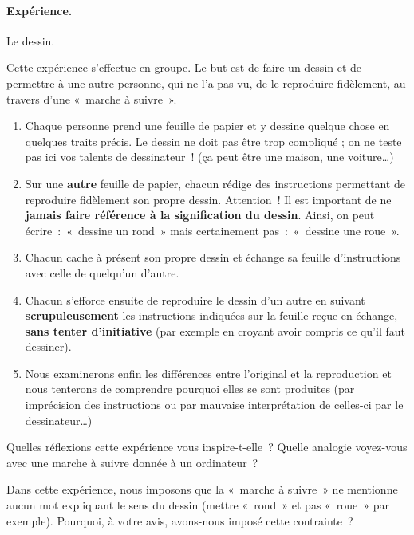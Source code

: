 			\begin{Emphase}
				\paragraph{Expérience.} Le dessin.
				
				Cette expérience s’effectue en groupe.
				Le but est de faire un dessin 
				et de permettre à une autre personne, 
				qui ne l’a pas vu, 
				de le reproduire fidèlement, 
				au travers d’une «~marche à suivre~».
	
				\begin{enumerate}
				\item
					Chaque personne prend une feuille de papier et 
					y dessine quelque chose en quelques traits précis. 
					Le dessin ne doit pas être trop compliqué ; 
					on ne teste pas ici vos talents de dessinateur~! 
					(ça peut être une maison, une voiture\dots)
				\item
					Sur une \textbf{autre} feuille de papier, 
					chacun rédige des instructions permettant de 
					reproduire fidèlement son propre dessin. 
					Attention~! Il est important de ne
					\textbf{jamais faire référence à la signification du dessin}. 
					Ainsi, on peut écrire~:~«~dessine un rond~» 
					mais certainement pas~:~«~dessine une roue~».
				\item
					Chacun cache à présent son propre dessin et échange 
					sa feuille d’instructions avec celle de quelqu’un d’autre.
				\item
					Chacun s’efforce ensuite 
					de reproduire le dessin d’un autre 
					en suivant \textbf{scrupuleusement} 
					les instructions indiquées sur la feuille reçue en échange, 
					\textbf{sans tenter d’initiative} 
					(par exemple en croyant avoir compris ce
					qu’il faut dessiner).
				\item
					Nous examinerons enfin les différences 
					entre l’original et la reproduction 
					et nous tenterons de comprendre 
					pourquoi elles se sont produites 
					(par imprécision des instructions 
					ou par mauvaise interprétation de celles-ci 
					par le dessinateur\dots)
				\end{enumerate}
			\end{Emphase}
	
			Quelles réflexions cette expérience vous inspire-t-elle~?
			Quelle analogie voyez-vous 
			avec une marche à suivre donnée à un ordinateur~?
	
			Dans cette expérience, 
			nous imposons que la «~marche à suivre~» 
			ne mentionne aucun mot expliquant le sens du dessin 
			(mettre «~rond~» et pas «~roue~» par exemple). 
			Pourquoi, à votre avis, avons-nous imposé cette contrainte~?
	
